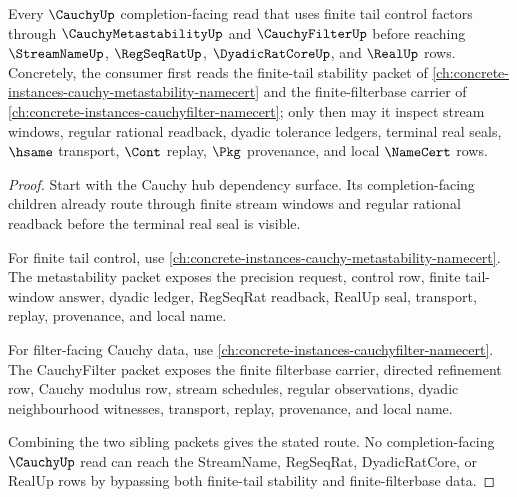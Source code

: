 \begin{theorem}
\label{thm:cauchy-orphan-sibling-route}
Every $\CauchyUp$ completion-facing read that uses finite tail control factors through $\CauchyMetastabilityUp$ and $\CauchyFilterUp$ before reaching $\StreamNameUp$, $\RegSeqRatUp$, $\DyadicRatCoreUp$, and $\RealUp$ rows. Concretely, the consumer first reads the finite-tail stability packet of \autoref{ch:concrete-instances-cauchy-metastability-namecert} and the finite-filterbase carrier of \autoref{ch:concrete-instances-cauchyfilter-namecert}; only then may it inspect stream windows, regular rational readback, dyadic tolerance ledgers, terminal real seals, $\hsame$ transport, $\Cont$ replay, $\Pkg$ provenance, and local $\NameCert$ rows.
\end{theorem}
\begin{proof}
Start with the Cauchy hub dependency surface. Its completion-facing children already route through finite stream windows and regular rational readback before the terminal real seal is visible.

For finite tail control, use \autoref{ch:concrete-instances-cauchy-metastability-namecert}. The metastability packet exposes the precision request, control row, finite tail-window answer, dyadic ledger, RegSeqRat readback, RealUp seal, transport, replay, provenance, and local name.

For filter-facing Cauchy data, use \autoref{ch:concrete-instances-cauchyfilter-namecert}. The CauchyFilter packet exposes the finite filterbase carrier, directed refinement row, Cauchy modulus row, stream schedules, regular observations, dyadic neighbourhood witnesses, transport, replay, provenance, and local name.

Combining the two sibling packets gives the stated route. No completion-facing $\CauchyUp$ read can reach the StreamName, RegSeqRat, DyadicRatCore, or RealUp rows by bypassing both finite-tail stability and finite-filterbase data.
\end{proof}
